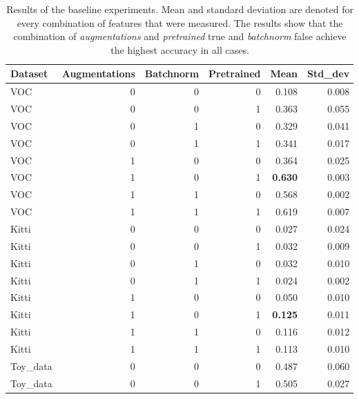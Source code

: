 \begin{table}[!htb]
	\centering
	\caption{Results of the baseline experiments. Mean and standard deviation are denoted for every combination of features that were measured. The results show that the combination of \textit{augmentations} and \textit{pretrained} true and \textit{batchnorm} false achieve the highest accuracy in all cases.}
	\begin{tabular}{lrrrrr}
		\toprule
		Dataset &  Augmentations &  Batchnorm &  Pretrained &   Mean &  Std\_dev \\
		\midrule
		VOC &              0 &          0 &           0 &  0.108 &    0.008 \\
		VOC &              0 &          0 &           1 &  0.363 &    0.055 \\
		VOC &              0 &          1 &           0 &  0.329 &    0.041 \\
		VOC &              0 &          1 &           1 &  0.341 &    0.017 \\
		VOC &              1 &          0 &           0 &  0.364 &    0.025 \\
		VOC &              1 &          0 &           1 &  \textbf{0.630} &    0.003 \\
		VOC &              1 &          1 &           0 &  0.568 &    0.002 \\
		VOC &              1 &          1 &           1 &  0.619 &    0.007 \\ \hdashline
		Kitti &              0 &          0 &           0 &  0.027 &    0.024 \\
		Kitti &              0 &          0 &           1 &  0.032 &    0.009 \\
		Kitti &              0 &          1 &           0 &  0.032 &    0.010 \\
		Kitti &              0 &          1 &           1 &  0.024 &    0.002 \\
		Kitti &              1 &          0 &           0 &  0.050 &    0.010 \\
		Kitti &              1 &          0 &           1 &  \textbf{0.125} &    0.011 \\
		Kitti &              1 &          1 &           0 &  0.116 &    0.012 \\
		Kitti &              1 &          1 &           1 &  0.113 &    0.010 \\ 
		\hdashline
		Toy\_data &              0 &          0 &           0 &  0.487 &    0.060 \\
		Toy\_data &              0 &          0 &           1 &  0.505 &    0.027 \\

\end{tabular}
\end{table}
